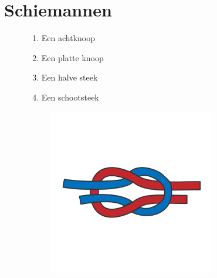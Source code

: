 \chapter{Schiemannen}
\vspace{-120px}

	\vspace{-20px}
\begin{figure}[H]	

	\begin{minipage}[]{0.70\textwidth}
		\begin{enumerate}[topsep=0pt, label=\Alph*.]
			\item Een achtknoop
			\item Een platte knoop
			\item Een halve steek
			\item Een schootsteek
		\end{enumerate}
	\end{minipage}
	\begin{minipage}[]{0.29\textwidth}
		\begin{figure}[H]
			\includegraphics[width=0.80\textwidth,right]{Hoofdstukken/Schiemannen/pdf/platteknoop.pdf}
		\end{figure}
	\end{minipage}
	\vspace{-20px}
\end{figure}


